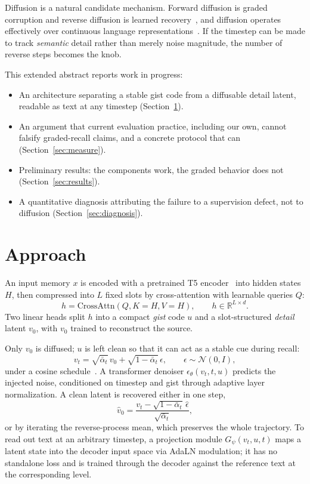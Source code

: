 \documentclass{article}
\begin{document}
Diffusion is a natural candidate mechanism. Forward diffusion is graded corruption and reverse diffusion is learned recovery~\citep{ho2020,nichol2021}, and diffusion operates effectively over continuous language representations~\citep{li2022,lovelace2023}. If the timestep can be made to track \emph{semantic} detail rather than merely noise magnitude, the number of reverse steps becomes the knob.

This extended abstract reports work in progress:
\begin{itemize}\setlength{\itemsep}{0pt}
  \item An architecture separating a stable gist code from a diffusable detail latent, readable as text at any timestep (Section~\ref{sec:approach}).
  \item An argument that current evaluation practice, including our own, cannot falsify graded-recall claims, and a concrete protocol that can (Section~\ref{sec:measure}).
  \item Preliminary results: the components work, the graded behavior does not (Section~\ref{sec:results}).
  \item A quantitative diagnosis attributing the failure to a supervision defect, not to diffusion (Section~\ref{sec:diagnosis}).
\end{itemize}

\section{Approach}
\label{sec:approach}

An input memory $x$ is encoded with a pretrained T5 encoder~\citep{raffel2020} into hidden states $H$, then compressed into $L$ fixed slots by cross-attention with learnable queries $Q$:
\begin{equation}
h = \mathrm{CrossAttn}(Q, K{=}H, V{=}H), \qquad h \in \mathbb{R}^{L \times d}.
\end{equation}
Two linear heads split $h$ into a compact \emph{gist} code $u$ and a slot-structured \emph{detail} latent $v_0$, with $v_0$ trained to reconstruct the source.

Only $v_0$ is diffused; $u$ is left clean so that it can act as a stable cue during recall:
\begin{equation}
v_t = \sqrt{\bar\alpha_t}\, v_0 + \sqrt{1-\bar\alpha_t}\, \epsilon,
\qquad \epsilon \sim \mathcal{N}(0, I),
\end{equation}
under a cosine schedule~\citep{nichol2021}. A transformer denoiser $\epsilon_\theta(v_t, t, u)$ predicts the injected noise, conditioned on timestep and gist through adaptive layer normalization. A clean latent is recovered either in one step,
\begin{equation}
\hat v_0 = \frac{v_t - \sqrt{1-\bar\alpha_t}\,\hat\epsilon}{\sqrt{\bar\alpha_t}},
\label{eq:onestep}
\end{equation}
or by iterating the reverse-process mean, which preserves the whole trajectory. To read out text at an arbitrary timestep, a projection module $G_\psi(v_t, u, t)$ maps a latent state into the decoder input space via AdaLN modulation; it has no standalone loss and is trained through the decoder against the reference text at the corresponding level.
\end{document}
